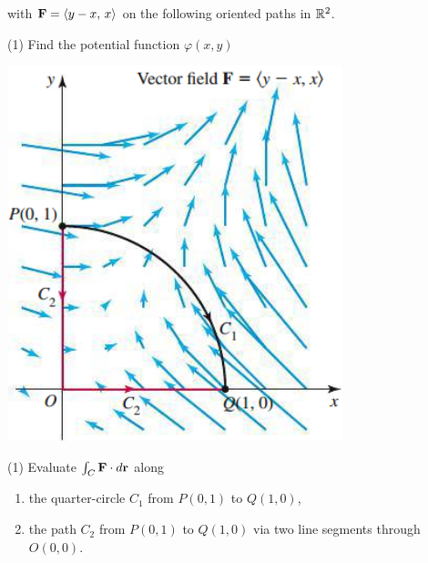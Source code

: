 \documentclass[mathNotesPreamble]{subfiles}
\begin{document}
  \begin{ex*}
     with $\mathbf F={\left\langle y-x,\,x \right\rangle}$ on the following oriented paths in $\mathbb{R}^2$.
  \end{ex*}
  \vspace*{-\baselineskip}
  \noindent
  \begin{minipage}[t]{0.6\linewidth}\mbox{}
    \begin{tasks}[after-item-skip=8\baselineskip, label=\alph*)](1)
      \task 
        Find the potential function $\varphi(x,y)$
    \end{tasks}
  \end{minipage}
  \begin{minipage}[t]{0.4\linewidth}\mbox{}
    \begin{flushright}
      \includegraphics[width=0.75\linewidth]{images/briggs_17_02/fig17_20}
    \end{flushright}
  \end{minipage}
  \begin{tasks}[after-item-skip=\stretch{1}, label=\alph*), resume](1)
    \task 
      Evaluate $\int_C \mathbf F\cdot d{\mathbf{r}}$ along
      \begin{enumerate}[itemsep=6\baselineskip, label=]
        \item 
          the quarter-circle $C_1$ from $P(0,1)$ to $Q(1,0)$,
        \item 
          the path $C_2$ from $P(0,1)$ to $Q(1,0)$ via two line segments through $O(0,0)$.
      \end{enumerate}
  \end{tasks}
  \pagebreak
\end{document}
